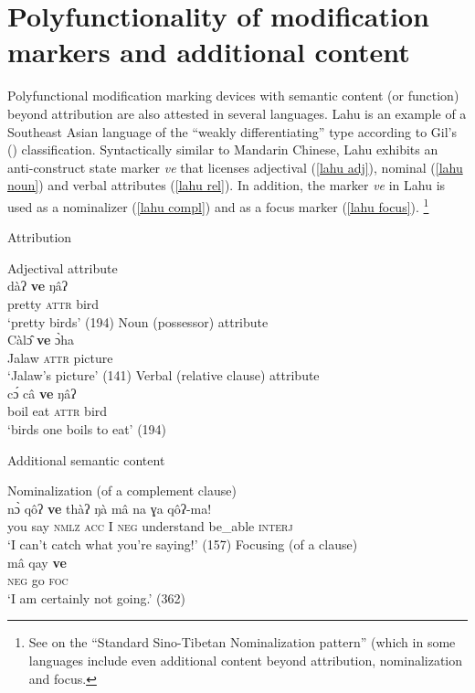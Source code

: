 \section[Polyfunctionality and additional content]{Polyfunctionality of modification markers and additional content}
Polyfunctional modification marking devices with semantic content (or function) beyond attribution are also attested in several languages. Lahu is an example of a Southeast Asian language of the “weakly differentiating” type according to Gil's (\citeyear{gil2005}) classification. Syntactically similar to Mandarin Chinese, Lahu exhibits an anti\hyp{}construct state marker \textit{ve} that licenses adjectival (\ref{lahu adj}), nominal (\ref{lahu noun}) and verbal attributes (\ref{lahu rel}). In addition, the marker \textit{ve} in Lahu is used as a nominalizer (\ref{lahu compl}) and as a focus marker (\ref{lahu focus}).
\footnote{See \citealt{bickel1999} on the “Standard Sino-Tibetan Nominalization pattern” (which in some languages include even additional content beyond attribution, nominalization and focus.}
\begin{exe}
\ex
{}
\begin{xlist}
\ex	\rm{Attribution}
\begin{xlist}
\ex	\rm{Adjectival attribute}\\
\gll	dàʔ	\textbf{ve}	ŋâʔ\\
	pretty	\textsc{attr}	bird\\
\glt	‘pretty birds’ (194)\label{lahu adj}
\ex	\rm{Noun (possessor) attribute}\\
\gll	Càl\^{ɔ}	\textbf{ve}	\`{ɔ}ha\\
	Jalaw	\textsc{attr}	picture\\
\glt	‘Jalaw's picture’ (141)\label{lahu noun}
\ex	\rm{Verbal (relative clause) attribute}\\
\gll	c\'{ɔ}	câ	\textbf{ve}	ŋâʔ\\
	boil	eat	\textsc{attr}	bird\\
\glt	‘birds one boils to eat’ (194)\label{lahu rel}
\end{xlist}
\ex	\rm{Additional semantic content}
\begin{xlist}
\ex \rm{Nominalization (of a complement clause)}\\
\gll	n\`{ɔ}	qôʔ \textbf{ve}	thàʔ	ŋà mâ	na ɣa	qôʔ-ma!\\
	you	say \textsc{nmlz}	\textsc{acc} I	\textsc{neg} understand	be\_able	\textsc{interj}\\
\glt	‘I can't catch what you're saying!’ (157)\label{lahu compl}
\ex	\rm{Focusing (of a clause)}\\
\gll	mâ		qay	\textbf{ve}\\
	\textsc{neg}	go	\textsc{foc}\\
\glt	‘I am certainly not going.’ (362)\label{lahu focus}
\end{xlist}
\end{xlist}
\end{exe}
